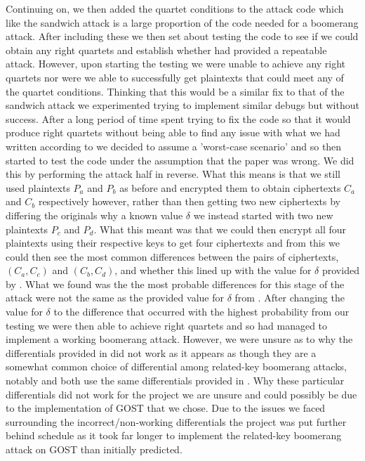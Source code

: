 \documentclass[10pt,journal,compsoc]{IEEEtran}
\begin{document}
Continuing on, we then added the quartet conditions to the attack code which like the sandwich attack is a large proportion of the code needed for a boomerang attack. After including these we then set about testing the code to see if we could obtain any right quartets and establish whether \cite{cryptoeprint:2010/111} had provided a repeatable attack. However, upon starting the testing we were unable to achieve any right quartets nor were we able to successfully get plaintexts that could meet any of the quartet conditions. Thinking that this would be a similar fix to that of the sandwich attack we experimented trying to implement similar debugs but without success. After a long period of time spent trying to fix the code so that it would produce right quartets without being able to find any issue with what we had written according to \cite{cryptoeprint:2010/111} we decided to assume a 'worst-case scenario' and so then started to test the code under the assumption that the paper was wrong. We did this by performing the attack half in reverse. What this means is that we still used plaintexts \(P_a\) and \(P_b\) as before and encrypted them to obtain ciphertexts \(C_a\) and \(C_b\) respectively however, rather than then getting two new ciphertexts by differing the originals why a known value \(\delta\) we instead started with two new plaintexts \(P_c\) and \(P_d\). What this meant was that we could then encrypt all four plaintexts using their respective keys to get four ciphertexts and from this we could then see the most common differences between the pairs of ciphertexts, \((C_a, C_c)\) and \((C_b, C_d)\), and whether this lined up with the value for \(\delta\) provided by \cite{cryptoeprint:2010/111}. What we found was the the most probable differences for this stage of the attack were not the same as the provided value for \(\delta\) from \cite{cryptoeprint:2010/111}. After changing the value for \(\delta\) to the difference that occurred with the highest probability from our testing we were then able to achieve right quartets and so had managed to implement a working boomerang attack. However, we were unsure as to why the differentials provided in \cite{cryptoeprint:2010/111} did not work as it appears as though they are a somewhat common choice of differential among related-key boomerang attacks, notably \cite{fse-2004-3110} and \cite{inproceedings} both use the same differentials provided in \cite{cryptoeprint:2010/111}. Why these particular differentials did not work for the project we are unsure and could possibly be due to the implementation of GOST that we chose. Due to the issues we faced surrounding the incorrect/non-working differentials the project was put further behind schedule as it took far longer to implement the related-key boomerang attack on GOST than initially predicted.
\end{document}
